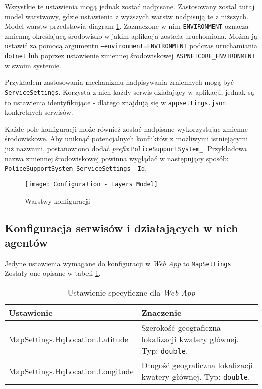 \par Wszystkie te ustawienia mogą jednak zostać nadpisane. Zastosowany został tutaj model warstwowy, gdzie ustawienia z wyższych warstw nadpisują te z niższych. Model warstw przedstawia diagram \ref{fig:configurationLayersModel}. Zaznaczone w nim \texttt{ENVIRONMENT} oznacza zmienną określającą środowisko w jakim aplikacja została uruchomiona. Można ją ustawić za pomocą argumentu \texttt{--environment=ENVIRONMENT} podczas uruchamiania \texttt{dotnet} lub poprzez ustawienie zmiennej środowiskowej \texttt{ASPNETCORE\_ENVIRONMENT} w swoim systemie\cite{MSDOCS_DOTNET_ENVIRONMENTS}.

\par Przykładem zastosowania mechanizmu nadpisywania zmiennych mogą być \texttt{ServiceSettings}. Korzysta z nich każdy serwis działający w aplikacji, jednak są to ustawienia identyfikujące - dlatego znajdują się w \texttt{appsettings.json} konkretnych serwisów.

\par Każde pole konfiguracji może również zostać nadpisane wykorzystując zmienne środowiskowe. Aby uniknąć potencjalnych konfliktów z możliwymi istniejącymi już nazwami, postanowiono dodać \emph{prefix} \texttt{PoliceSupportSystem\_}. Przykładowa nazwa zmiennej środowiskowej powinna wyglądać w następujący sposób: \texttt{PoliceSupportSystem\_ServiceSettings\_\_Id}.

\begin{figure}
    \centering
    \texttt{[image: Configuration - Layers Model]}
    \caption{Warstwy konfiguracji}
    \label{fig:configurationLayersModel}
\end{figure}

\subsection{Konfiguracja serwisów i działających w nich agentów}

\par Jedyne ustawienia wymagane do konfiguracji w \emph{Web App} to \texttt{MapSettings}. Zostały one opisane w tabeli \ref{tab:configurationWebAppSettings}.

\begin{table}[H]
    \centering
    \begin{tabular}{|p{0.5\linewidth} | p{0.5\linewidth}|} 
     \hline
     Ustawienie & Znaczenie \\
     \hline
     \hline
     MapSettings.HqLocation.Latitude & Szerokość geograficzna lokalizacji kwatery głównej. Typ: \texttt{double}. \\ 
     \hline
     MapSettings.HqLocation.Longitude & Długość geograficzna lokalizacji kwatery głównej. Typ: \texttt{double}. \\ 
     \hline
    \end{tabular}
    \caption{Ustawienie specyficzne dla \emph{Web App}}
    \label{tab:configurationWebAppSettings}
\end{table}

